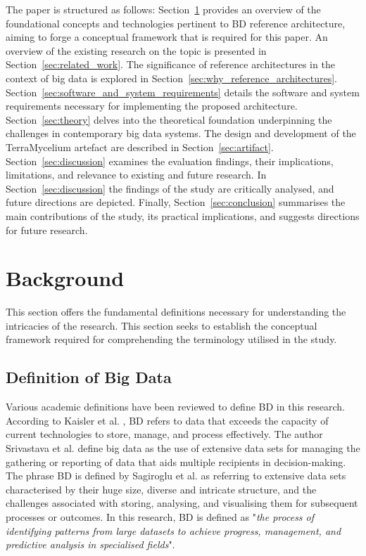 \documentclass{ieeeaccess}
\begin{document}
The paper is structured as follows: Section~\ref{sec:background} provides an overview of the foundational concepts and technologies pertinent to BD reference architecture, aiming to forge a conceptual framework that is required for this paper. An overview of the existing research on the topic is presented in Section~\ref{sec:related_work}. The significance of reference architectures in the context of big data is explored in Section~\ref{sec:why_reference_architectures}. Section~\ref{sec:software_and_system_requirements} details the software and system requirements necessary for implementing the proposed architecture. Section~\ref{sec:theory} delves into the theoretical foundation underpinning the challenges in contemporary big data systems. The design and development of the TerraMycelium artefact are described in Section~\ref{sec:artifact}. Section~\ref{sec:discussion} examines the evaluation findings, their implications, limitations, and relevance to existing and future research. In Section~\ref{sec:discussion} the findings of the study are critically analysed, and future directions are depicted. Finally, Section~\ref{sec:conclusion} summarises the main contributions of the study, its practical implications, and suggests directions for future research.

\section{Background} \label{sec:background} 

This section offers the fundamental definitions necessary for understanding the intricacies of the research. This section seeks to establish the conceptual framework required for comprehending the terminology utilised in the study. 

\subsection{Definition of Big Data} Various academic definitions have been reviewed to define BD in this research. According to Kaisler et al. \cite{Kaisler2013}, BD refers to data that exceeds the capacity of current technologies to store, manage, and process effectively. The author Srivastava et al. \cite{Srivastava2016} define big data as the use of extensive data sets for managing the gathering or reporting of data that aids multiple recipients in decision-making. The phrase BD is defined by Sagiroglu et al. \cite{Sagiroglu2013} as referring to extensive data sets characterised by their huge size, diverse and intricate structure, and the challenges associated with storing, analysing, and visualising them for subsequent processes or outcomes. In this research, BD is defined as "\emph{the process of identifying patterns from large datasets to achieve progress, management, and predictive analysis in specialised fields}". 
\end{document}
